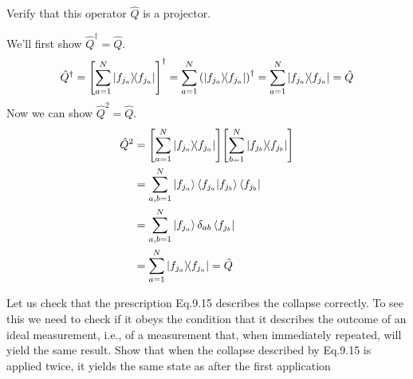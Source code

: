 \documentclass[boxes,pages]{homework}
\makeatletter
\newcommand{\herm}[1]{{{#1}^\dagger}}
\numberwithin{@problem}{section}
\makeatother
\begin{document}
\begin{problem}
Verify that this operator $\hat{Q}$ is a projector.
\end{problem}

\begin{solution}
	We'll first show $\herm{\hat{Q}} = \hat{Q}$.
	\begin{equation*}
		\herm{\hat{Q}} = \herm{\qty[\sum_{a = 1}^N\ketbra{f_{j_a}}]} = \sum_{a = 1}^N\herm{\qty(\ketbra{f_{j_a}})} = \sum_{a = 1}^N\ketbra{f_{j_a}} = \hat{Q}
	\end{equation*}
	Now we can show $\hat{Q}^2 = \hat{Q}$.
	\begin{align*}
		\hat{Q}^2 & = \qty[\sum_{a = 1}^N\ketbra{f_{j_a}}]\qty[\sum_{b = 1}^N\ketbra{f_{j_b}}] \\
		          & = \sum_{a, b = 1}^N\ket{f_{j_a}}\braket{f_{j_a}}{f_{j_b}}\bra{f_{j_b}}     \\
		          & = \sum_{a, b = 1}^N\ket{f_{j_a}}\delta_{ab}\bra{f_{j_b}}                   \\
		          & = \sum_{a = 1}^N\ketbra{f_{j_a}} = \hat{Q}
	\end{align*}
\end{solution}

\begin{problem}
Let us check that the prescription Eq.9.15 describes the collapse correctly. To see this we need to check if it obeys the condition that it describes the outcome of an ideal measurement, i.e., of a measurement that, when immediately repeated, will yield the same result. Show that when the collapse described by Eq.9.15 is applied twice, it yields the same state as after the first application
\end{problem}
\end{document}
